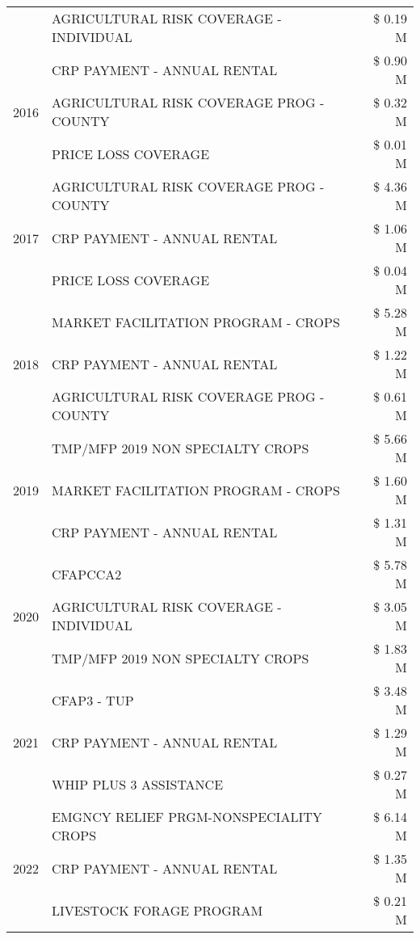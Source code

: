 \begin{tabular}{llr}
 & AGRICULTURAL RISK COVERAGE - INDIVIDUAL & \$ 0.19 M \\
\cline{1-3}
\multirow[t]{3}{*}{2016} & CRP PAYMENT - ANNUAL RENTAL & \$ 0.90 M \\
 & AGRICULTURAL RISK COVERAGE PROG - COUNTY & \$ 0.32 M \\
 & PRICE LOSS COVERAGE & \$ 0.01 M \\
\cline{1-3}
\multirow[t]{3}{*}{2017} & AGRICULTURAL RISK COVERAGE PROG - COUNTY & \$ 4.36 M \\
 & CRP PAYMENT - ANNUAL RENTAL & \$ 1.06 M \\
 & PRICE LOSS COVERAGE & \$ 0.04 M \\
\cline{1-3}
\multirow[t]{3}{*}{2018} & MARKET FACILITATION PROGRAM - CROPS & \$ 5.28 M \\
 & CRP PAYMENT - ANNUAL RENTAL & \$ 1.22 M \\
 & AGRICULTURAL RISK COVERAGE PROG - COUNTY & \$ 0.61 M \\
\cline{1-3}
\multirow[t]{3}{*}{2019} & TMP/MFP 2019 NON SPECIALTY CROPS & \$ 5.66 M \\
 & MARKET FACILITATION PROGRAM - CROPS & \$ 1.60 M \\
 & CRP PAYMENT - ANNUAL RENTAL & \$ 1.31 M \\
\cline{1-3}
\multirow[t]{3}{*}{2020} & CFAPCCA2 & \$ 5.78 M \\
 & AGRICULTURAL RISK COVERAGE - INDIVIDUAL & \$ 3.05 M \\
 & TMP/MFP 2019 NON SPECIALTY CROPS & \$ 1.83 M \\
\cline{1-3}
\multirow[t]{3}{*}{2021} & CFAP3 - TUP & \$ 3.48 M \\
 & CRP PAYMENT - ANNUAL RENTAL & \$ 1.29 M \\
 & WHIP PLUS 3 ASSISTANCE & \$ 0.27 M \\
\cline{1-3}
\multirow[t]{3}{*}{2022} & EMGNCY RELIEF PRGM-NONSPECIALITY CROPS & \$ 6.14 M \\
 & CRP PAYMENT - ANNUAL RENTAL & \$ 1.35 M \\
 & LIVESTOCK FORAGE PROGRAM & \$ 0.21 M \\
\cline{1-3}
\bottomrule
\end{tabular}
